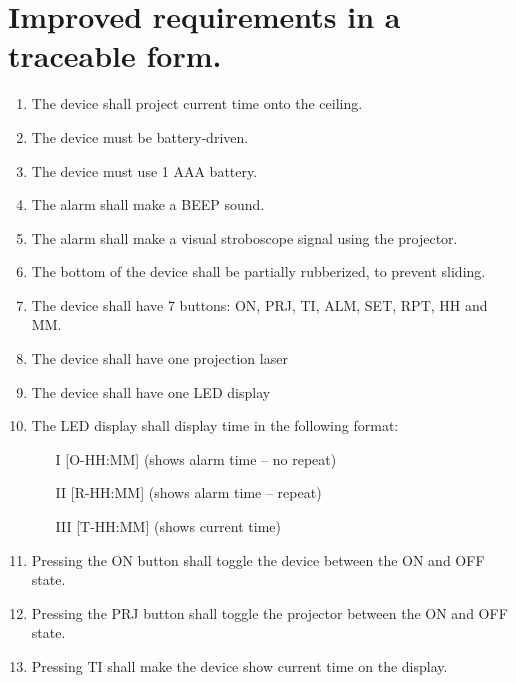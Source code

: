 \documentclass[Main_Assignment2]{subfiles}
\begin{document}
\section{Improved requirements in a traceable form.}

\begin{enumerate}[label=RE\arabic*:]
	\item 
	The device shall project current time onto the ceiling.
	
	\item 
	The device must be battery-driven.

	\item
	The device must use 1 AAA battery.

	\item
	The alarm shall make a BEEP sound.

	\item 
	The alarm shall make a visual stroboscope signal using the projector.

	\item
	The bottom of the device shall be partially rubberized, to prevent sliding.

	\item
	The device shall have 7 buttons: ON, PRJ, TI, ALM, SET, RPT, HH and MM.

	\item
	The device shall have one projection laser

	\item
	The device shall have one LED display

	\item
	The LED display shall display time in the following format:

	\begin{itemize}
		\item [I] [O-HH:MM] (shows alarm time – no repeat)
		\item [II] [R-HH:MM] (shows alarm time – repeat)
		\item [III] [T-HH:MM] (shows current time)

	\end{itemize}

	\item
	Pressing the ON button shall toggle the device between the ON and OFF state.

	\item
	Pressing the PRJ button shall toggle the projector between the ON and OFF state.	

	\item
	Pressing TI shall make the device show current time on the display.


\end{enumerate}
\end{document}
